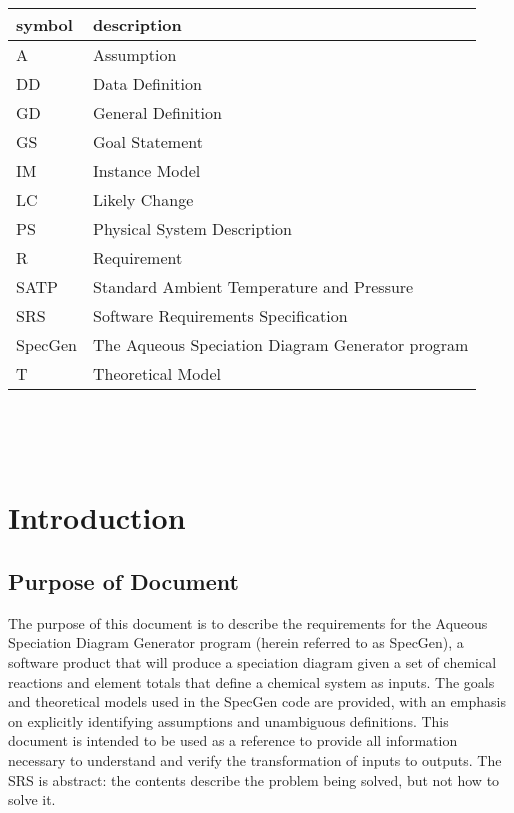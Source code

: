 \documentclass[12pt]{article}
\newcommand{\progname}{SpecGen} %
\begin{document}
\renewcommand{\arraystretch}{1.2}
\begin{tabular}{l l} 
  \toprule		
  \textbf{symbol} & \textbf{description}\\
  \midrule 
  A & Assumption\\
  DD & Data Definition\\
  GD & General Definition\\
  GS & Goal Statement\\
  IM & Instance Model\\
  LC & Likely Change\\
  PS & Physical System Description\\
  R & Requirement\\
  SATP & Standard Ambient Temperature and Pressure\\
  SRS & Software Requirements Specification\\
  \progname{} & The Aqueous Speciation Diagram Generator program\\
  T & Theoretical Model\\
  \bottomrule
\end{tabular}\\

\newpage

\tableofcontents

~\newpage


\setcounter{secnumdepth}{3}

\section{Introduction}

\subsection{Purpose of Document}
The purpose of this document is to describe the requirements for the Aqueous 
Speciation Diagram Generator program (herein referred to as \progname), a 
software product that will produce a speciation diagram given a set of chemical 
reactions and element totals that define a chemical system as inputs.  The goals 
and theoretical models used in the SpecGen code are provided, with an emphasis 
on explicitly identifying assumptions and unambiguous definitions. This document 
is intended to be used as a reference to provide all information necessary to 
understand and verify the transformation of inputs to outputs. The SRS is 
abstract: the contents describe the problem being solved, but not how to solve 
it.
\end{document}

